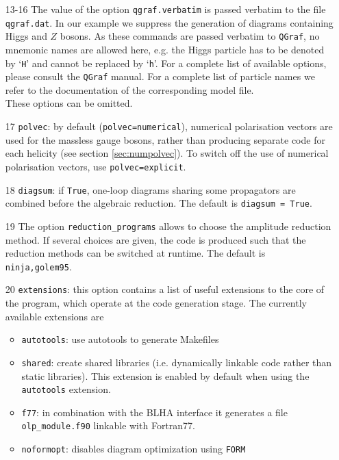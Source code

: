 \documentclass[11pt,a4paper]{refrep}
\newcommand{\qgraf}{{\tt QGraf}\xspace}
\newcommand{\form}{{\tt FORM}\xspace}
\begin{document}
\begin{enumerate}
\item[13-16] 
 The value of the option \texttt{qgraf.verbatim} is
passed verbatim to the file \texttt{qgraf.dat}.
In our example we suppress the generation of diagrams containing Higgs and $Z$ bosons.
As these commands are passed verbatim to \qgraf, no mnemonic names
are allowed here, e.g. the Higgs particle has to be denoted by
`\lstinline[basicstyle=\ttfamily]{H}' and cannot be replaced by
`\lstinline[basicstyle=\ttfamily]{h}'.
For a complete list of available options, please consult the
\qgraf{} manual. For a complete list of particle names we refer to the 
documentation of the corresponding model file.
\\These options can be omitted.
\item[17] \texttt{polvec}: by default ({\tt polvec=numerical}), 
numerical polarisation vectors are used for the massless gauge bosons, 
rather than producing separate code for each helicity
(see section \ref{sec:numpolvec}). 
To switch off the use of numerical polarisation vectors, use {\tt polvec=explicit}.
\item[18] \texttt{diagsum}:  if {\tt True}, one-loop diagrams sharing some propagators
are combined before  the algebraic reduction.
The default is {\tt diagsum = True}. 
\item[19] The option \texttt{reduction\_programs} 
allows to choose the amplitude reduction method. If several choices are given, 
the code is produced such that the reduction methods can be switched at runtime.
The default is {\tt ninja,golem95}.
\item[20] {\tt extensions}: 
this option  contains a list of useful extensions
to the core of the program, which operate at the code generation stage. 
The currently available extensions are 
\begin{itemize}
\item {\tt autotools}:  use autotools to generate Makefiles            
\item {\tt shared}: create shared libraries (i.e. dynamically linkable code
rather than static libraries). This extension is 
enabled by default when using the {\tt autotools} extension.    
\item {\tt f77}: in combination with the BLHA interface it generates
                     a file {\tt olp\_module.f90} linkable with Fortran77.      
\item {\tt noformopt}:  disables diagram optimization using \form        

\end{itemize}
\end{enumerate}
\end{document}
